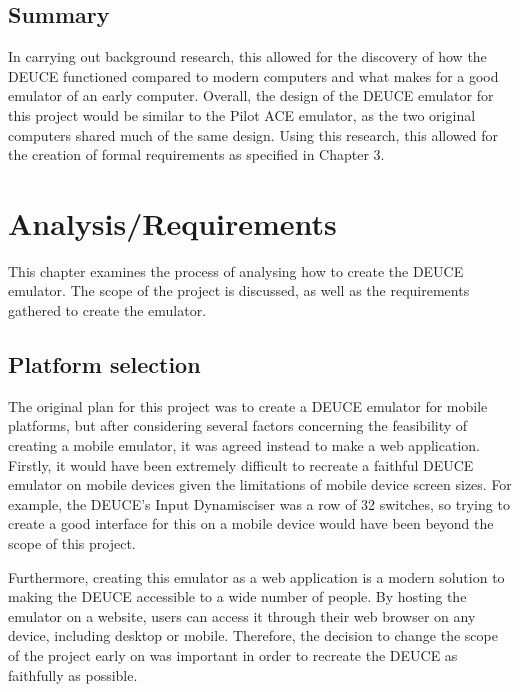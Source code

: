 \documentclass{l4proj}
\begin{document}
\section{Summary}
In carrying out background research, this allowed for the discovery of how the DEUCE functioned compared to modern computers and what makes for a good emulator of an early computer. Overall, the design of the DEUCE emulator for this project would be similar to the Pilot ACE emulator, as the two original computers shared much of the same design. Using this research, this allowed for the creation of formal requirements as specified in Chapter 3.

\chapter{Analysis/Requirements}
This chapter examines the process of analysing how to create the DEUCE emulator. The scope of the project is discussed, as well as the requirements gathered to create the emulator.

\section{Platform selection}
The original plan for this project was to create a DEUCE emulator for mobile platforms, but after considering several factors concerning the feasibility of creating a mobile emulator, it was agreed instead to make a web application. Firstly, it would have been extremely difficult to recreate a faithful DEUCE emulator on mobile devices given the limitations of mobile device screen sizes. For example, the DEUCE's Input Dynamisciser was a row of 32 switches, so trying to create a good interface for this on a mobile device would have been beyond the scope of this project.

Furthermore, creating this emulator as a web application is a modern solution to making the DEUCE accessible to a wide number of people. By hosting the emulator on a website, users can access it through their web browser on any device, including desktop or mobile. Therefore, the decision to change the scope of the project early on was important in order to recreate the DEUCE as faithfully as possible.
\end{document}
